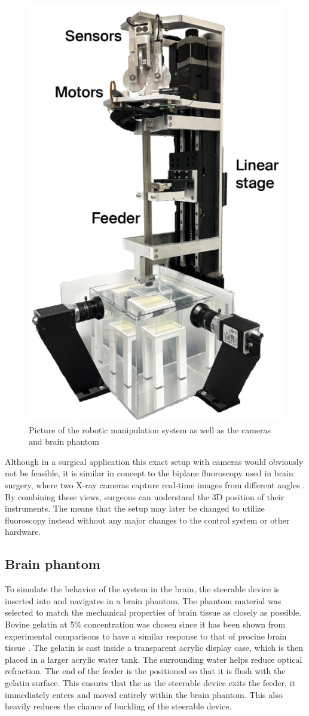 \begin{figure} [H]
    \centering
    \includegraphics[width=0.5\linewidth]{images/Hardware/insertionStrategy.PNG}
    \caption{Picture of the robotic manipulation system as well as the cameras and brain phantom}
    \label{fig:roboticmanipulationsystem}
\end{figure}

Although in a surgical application this exact setup with cameras would obviously not be feasible, it is similar in concept to the biplane fluoroscopy used in brain surgery, where two X-ray cameras capture real-time images from different angles \cite{weise_intraoperative_2012}. By combining these views, surgeons can understand the 3D position of their instruments. The means that the setup may later be changed to utilize fluoroscopy instead without any major changes to the control system or other hardware.

\subsection{Brain phantom}
To simulate the behavior of the system in the brain, the steerable device is inserted into and navigates in a brain phantom. The phantom material was selected to match the mechanical properties of brain tissue as closely as possible. Bovine gelatin at 5\% concentration was chosen since it has been shown from experimental comparisons to have a similar response to that of procine brain tissue \cite{singh_comparison_2019}.
\newline \newline
The gelatin is cast inside a transparent acrylic display case, which is then placed in a larger acrylic water tank. The surrounding water helps reduce optical refraction. The end of the feeder is the positioned so that it is flush with the gelatin surface. This ensures that the as the steerable device exits the feeder, it immediately enters and moved entirely within the brain phantom. This also heavily reduces the chance of buckling of the steerable device.


